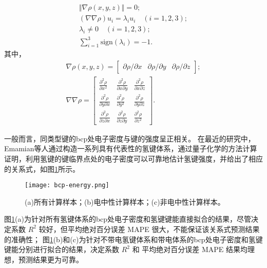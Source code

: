 \begin{gather}
    \Vert \nabla\rho(x,y,z)  \Vert = 0; \\
    (\nabla\nabla\rho)u_i = \lambda_i u_i\quad (i=1,2,3); \\
    \lambda_i \neq 0 \quad (i=1,2,3); \\
    \sum_{i=1}^3\text{sign}(\lambda_i) = -1.  
\end{gather}
其中，
\begin{gather}
    \nabla\rho(x,y,z) = 
    \begin{bmatrix}
        \partial\rho/\partial x & \partial\rho/\partial y & \partial\rho/\partial z
    \end{bmatrix}; \\
    \nabla\nabla\rho= 
    \begin{bmatrix}
        \displaystyle\frac{\partial^2 \rho}{\partial x^2} & \displaystyle\frac{\partial^2 \rho}{\partial x\partial y} & \displaystyle\frac{\partial^2 \rho}{\partial x \partial z} \\
        \displaystyle\frac{\partial^2 \rho }{\partial y \partial x} & \displaystyle\frac{\partial^2 \rho }{\partial y^2} & \displaystyle\frac{\partial^2 \rho }{\partial y \partial z} \\
        \displaystyle\frac{\partial^2 \rho }{\partial z \partial x} & \displaystyle\frac{\partial^2 \rho }{\partial z \partial y} & \displaystyle\frac{\partial^2 \rho }{\partial z^2}
    \end{bmatrix}.
\end{gather}

一般而言，同类型键的bcp处电子密度与键的强度呈正相关。
在最近的研究中，Emamian等人通过构造一系列具有代表性的氢键体系，通过量子化学的方法计算证明，利用氢键的键临界点处的电子密度可以可靠地估计氢键强度，并给出了相应的关系式，如图\ref{fig:bcp-energy}所示。

\begin{figure}[htbp]
    \centering
    \texttt{[image: bcp-energy.png]}
    \caption{(a)所有计算样本；(b)电中性计算样本；(c)非电中性计算样本。}
    \label{fig:bcp-energy}
\end{figure}

图\ref{fig:bcp-energy}(a)为针对所有氢键体系的bcp处电子密度和氢键键能直接拟合的结果，尽管决定系数 $R^2$ 较好，但平均绝对百分误差 MAPE 很大，不能保证该关系式预测结果的准确性；
图\ref{fig:bcp-energy}(b)和(c)为针对不带电氢键体系和带电体系的bcp处电子密度和氢键键能分别进行拟合的结果，决定系数 $R^2$ 和 平均绝对百分误差 MAPE 结果均理想，预测结果更为可靠。

